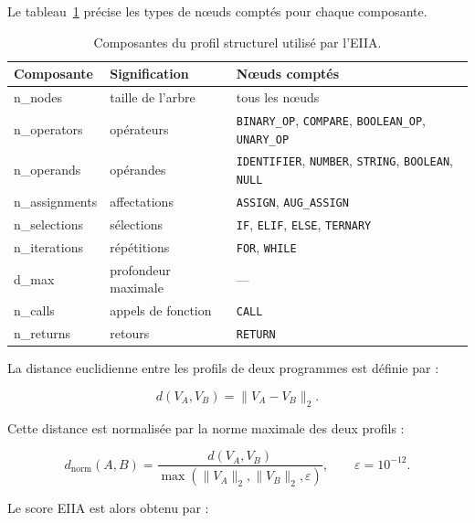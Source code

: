 {Le tableau~\ref{tab:eiia_composantes} précise les types de nœuds comptés pour
chaque composante.

\begin{table}[H]
\centering
\small
\renewcommand{\arraystretch}{1.25}
\begin{tabular}{>{\ttfamily}l l l}
\toprule
\textrm{\textbf{Composante}} & \textbf{Signification} & \textbf{Nœuds comptés} \\
\midrule
n\_nodes       & taille de l'arbre        & tous les nœuds \\
n\_operators   & opérateurs              & \texttt{BINARY\_OP}, \texttt{COMPARE}, \texttt{BOOLEAN\_OP}, \texttt{UNARY\_OP} \\
n\_operands    & opérandes               & \texttt{IDENTIFIER}, \texttt{NUMBER}, \texttt{STRING}, \texttt{BOOLEAN}, \texttt{NULL} \\
n\_assignments & affectations            & \texttt{ASSIGN}, \texttt{AUG\_ASSIGN} \\
n\_selections  & sélections              & \texttt{IF}, \texttt{ELIF}, \texttt{ELSE}, \texttt{TERNARY} \\
n\_iterations  & répétitions             & \texttt{FOR}, \texttt{WHILE} \\
d\_max         & profondeur maximale     & --- \\
n\_calls       & appels de fonction      & \texttt{CALL} \\
n\_returns     & retours                 & \texttt{RETURN} \\
\bottomrule
\end{tabular}
\caption{Composantes du profil structurel utilisé par l'EIIA.}
\label{tab:eiia_composantes}
\end{table}

La distance euclidienne entre les profils de deux programmes est définie par :

\begin{equation}
d(V_A,V_B) = \lVert V_A - V_B \rVert_2 .
\end{equation}

Cette distance est normalisée par la norme maximale des deux profils :

\begin{equation}
d_{\mathrm{norm}}(A,B) =
\frac{d(V_A,V_B)}{\max\left(\lVert V_A \rVert_2,
\lVert V_B \rVert_2,\varepsilon\right)},
\qquad \varepsilon = 10^{-12}.
\end{equation}

Le score EIIA est alors obtenu par :

}
